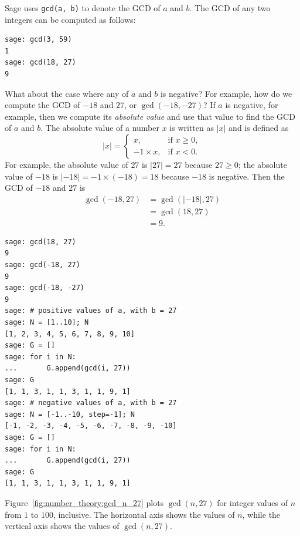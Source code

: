 Sage uses \verb!gcd(a, b)! to denote the GCD of $a$ and $b$. The GCD
of any two integers can be computed as follows:
%
\begin{lstlisting}
sage: gcd(3, 59)
1
sage: gcd(18, 27)
9
\end{lstlisting}

What about the case where any of $a$ and $b$ is negative? For example,
how do we compute the GCD of $-18$ and $27$, or $\gcd(-18, -27)$? If
$a$ is negative, for example, then we compute its
\emph{absolute value} and use that value to find
the GCD of $a$ and $b$. The absolute value of a number $x$ is written
as $|x|$ and is defined as
\[
|x|
=
\begin{cases}
x, & \text{if $x \geq 0$}, \\
-1 \times x, & \text{if $x < 0$}.
\end{cases}
\]
For example, the absolute value of $27$ is $|27| = 27$ because
$27 \geq 0$; the absolute value of $-18$ is
$|-18| = -1 \times (-18) = 18$ because $-18$ is negative. Then the GCD
of $-18$ and $27$ is
%
\begin{align*}
\gcd(-18, 27)
&=
\gcd(|-18|, 27) \\
&=
\gcd(18, 27) \\
&=
9.
\end{align*}

\begin{lstlisting}
sage: gcd(18, 27)
9
sage: gcd(-18, 27)
9
sage: gcd(-18, -27)
9
sage: # positive values of a, with b = 27
sage: N = [1..10]; N
[1, 2, 3, 4, 5, 6, 7, 8, 9, 10]
sage: G = []
sage: for i in N:
...       G.append(gcd(i, 27))
sage: G
[1, 1, 3, 1, 1, 3, 1, 1, 9, 1]
sage: # negative values of a, with b = 27
sage: N = [-1..-10, step=-1]; N
[-1, -2, -3, -4, -5, -6, -7, -8, -9, -10]
sage: G = []
sage: for i in N:
...       G.append(gcd(i, 27))
sage: G
[1, 1, 3, 1, 1, 3, 1, 1, 9, 1]
\end{lstlisting}

Figure~\ref{fig:number_theory:gcd_n_27} plots $\gcd(n, 27)$ for
integer values of $n$ from $1$ to $100$, inclusive. The horizontal
axis shows the values of $n$, while the vertical axis shows the values
of $\gcd(n, 27)$.

